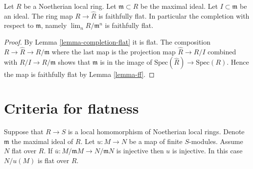\begin{lemma}
\label{lemma-completion-faithfully-flat}
Let $R$ be a Noetherian local ring.
Let $\mathfrak m \subset R$ be the maximal ideal.
Let $I \subset \mathfrak m$ be an ideal.
The ring map $R \to \hat R$ is faithfully flat.
In particular the completion with respect to $\mathfrak m$,
namely $\lim_n R/\mathfrak m^n$ is faithfully flat.
\end{lemma}

\begin{proof}
By Lemma \ref{lemma-completion-flat} it is flat.
The composition $R \to \hat R \to R/\mathfrak m$ where
the last map is the projection map $\hat R \to R/I$
combined with $R/I \to R/\mathfrak m$ shows that
$\mathfrak m$ is in the image of $\text{Spec}(\hat R)
\to \text{Spec}(R)$. Hence the map is faithfully
flat by Lemma \ref{lemma-ff}.
\end{proof}























\section{Criteria for flatness}
\label{section-criteria-flatness}

\begin{lemma}
\label{lemma-mod-injective}
Suppose that $R \to S$ is a local homomorphism of Noetherian
local rings. Denote $\mathfrak m$ the maximal ideal of $R$.
Let $u : M \to N$ be a map of finite $S$-modules.
Assume $N$ flat over $R$.
If $\overline{u} : M/\mathfrak mM \to N/\mathfrak mN$
is injective then $u$ is injective.
In this case $N/u(M)$ is flat over $R$.
\end{lemma}

